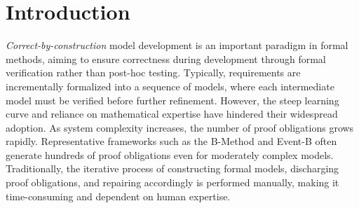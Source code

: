 \section{Introduction} \label{sec:intro}

\emph{Correct-by-construction} model development is an important paradigm in formal methods, aiming to ensure correctness during development through formal verification rather than post-hoc testing.
Typically, requirements are incrementally formalized into a sequence of models, where each intermediate model must be verified before further refinement.
However, the steep learning curve and reliance on mathematical expertise have hindered their widespread adoption.
As system complexity increases, the number of proof obligations grows rapidly.
Representative frameworks such as the B-Method \cite{abrial1996b} and Event-B \cite{abrial2010modeling} often generate hundreds of proof obligations even for moderately complex models.
Traditionally, the iterative process of constructing formal models, discharging proof obligations, and repairing accordingly is performed manually, making it time-consuming and dependent on human expertise.

